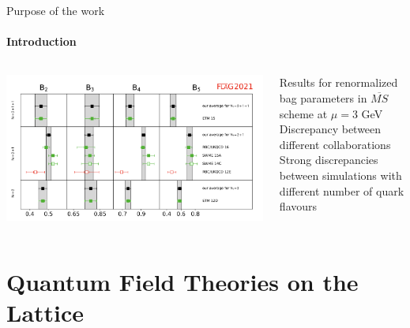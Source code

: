 \documentclass{beamer}
\begin{document}
\begin{frame}{Purpose of the work}
      \framesubtitle{Introduction}
      \begin{columns}
            \begin{column}{0.7\textwidth}
                  \includegraphics[width=\textwidth]{assets/Bi3GeV-falg2021.png}
            \end{column}
            \begin{column}{0.3\textwidth}
                  Results for renormalized bag parameters in $\overline{MS}$ scheme at $\mu = 3$ GeV
                  \\ \vspace{\baselineskip}
                  Discrepancy between different collaborations
                  \\ \vspace{\baselineskip}
                  Strong discrepancies between simulations with different number of quark flavours
            \end{column}
      \end{columns}
\end{frame}

\section{Quantum Field Theories on the Lattice}
\end{document}
